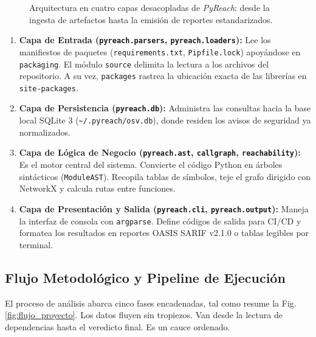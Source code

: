 \documentclass[conference]{IEEEtran}
\begin{document}
\begin{figure}[!htbp]
{
}
\caption{Arquitectura en cuatro capas desacopladas de \textit{PyReach}: desde la ingesta de artefactos hasta la emisión de reportes estandarizados.}
\label{fig:arquitectura_capas}
\end{figure}

\begin{enumerate}
    \item \textbf{Capa de Entrada (\texttt{pyreach.parsers}, \texttt{pyreach.loaders}):} Lee los manifiestos de paquetes (\texttt{requirements.txt}, \texttt{Pipfile.lock}) apoyándose en \texttt{packaging}. El módulo \texttt{source} delimita la lectura a los archivos del repositorio. A su vez, \texttt{packages} rastrea la ubicación exacta de las librerías en \texttt{site-packages}.
    \item \textbf{Capa de Persistencia (\texttt{pyreach.db}):} Administra las consultas hacia la base local SQLite 3 (\texttt{\~{}/.pyreach/osv.db}), donde residen los avisos de seguridad ya normalizados.
    \item \textbf{Capa de Lógica de Negocio (\texttt{pyreach.ast}, \texttt{callgraph}, \texttt{reachability}):} Es el motor central del sistema. Convierte el código Python en árboles sintácticos (\texttt{ModuleAST}). Recopila tablas de símbolos, teje el grafo dirigido con NetworkX y calcula rutas entre funciones.
    \item \textbf{Capa de Presentación y Salida (\texttt{pyreach.cli}, \texttt{pyreach.output}):} Maneja la interfaz de consola con \texttt{argparse}. Define códigos de salida para CI/CD y formatea los resultados en reportes OASIS SARIF v2.1.0 o tablas legibles por terminal.
\end{enumerate}

\subsection{Flujo Metodológico y Pipeline de Ejecución}
El proceso de análisis abarca cinco fases encadenadas, tal como resume la Fig. \ref{fig:flujo_proyecto}. Los datos fluyen sin tropiezos. Van desde la lectura de dependencias hasta el veredicto final. Es un cauce ordenado.
\end{document}
